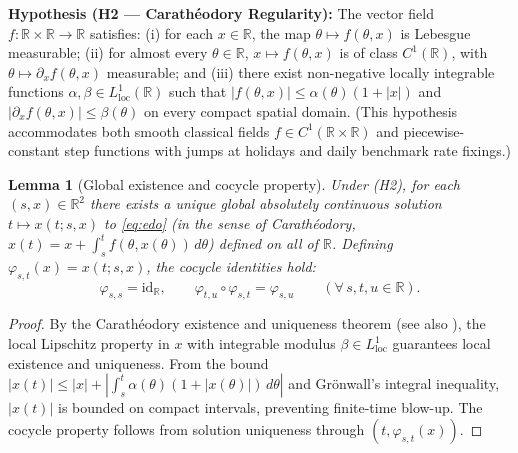 \documentclass[11pt, a4paper]{article}
\theoremstyle{definition}
\theoremstyle{plain}
\newtheorem{lema}[definicao]{Lemma}
\theoremstyle{remark}
\begin{document}
\noindent\textbf{Hypothesis (H2 — Carathéodory Regularity):} The vector field $f : \mathbb{R} \times \mathbb{R} \to \mathbb{R}$ satisfies: (i) for each $x \in \mathbb{R}$, the map $\theta \mapsto f(\theta, x)$ is Lebesgue measurable; (ii) for almost every $\theta \in \mathbb{R}$, $x \mapsto f(\theta, x)$ is of class $C^1(\mathbb{R})$, with $\theta \mapsto \partial_x f(\theta, x)$ measurable; and (iii) there exist non-negative locally integrable functions $\alpha, \beta \in L^1_{\text{loc}}(\mathbb{R})$ such that $|f(\theta, x)| \le \alpha(\theta)(1 + |x|)$ and $|\partial_x f(\theta, x)| \le \beta(\theta)$ on every compact spatial domain. (This hypothesis accommodates both smooth classical fields $f \in C^1(\mathbb{R} \times \mathbb{R})$ and piecewise-constant step functions with jumps at holidays and daily benchmark rate fixings.)

\begin{lema}[Global existence and cocycle property]\label{lem:3.1}
Under (H2), for each $(s, x) \in \mathbb{R}^2$ there exists a unique global absolutely continuous solution $t \mapsto x(t; s, x)$ to \eqref{eq:edo} (in the sense of Carathéodory, $x(t) = x + \int_s^t f(\theta, x(\theta))\,d\theta$) defined on all of $\mathbb{R}$. Defining $\varphi_{s,t}(x) = x(t; s, x)$, the cocycle identities hold:
\[
\varphi_{s,s} = \mathrm{id}_{\mathbb{R}}, \qquad \varphi_{t,u} \circ \varphi_{s,t} = \varphi_{s,u} \qquad (\forall\, s, t, u \in \mathbb{R}).
\]
\end{lema}
\begin{proof}
By the Carathéodory existence and uniqueness theorem \cite[Chap.~2]{CoddingtonLevinson1955} (see also \cite{Hartman2002, HirschSmaleDevaney2013, Sotomayor1979}), the local Lipschitz property in $x$ with integrable modulus $\beta \in L^1_{\text{loc}}$ guarantees local existence and uniqueness. From the bound $|x(t)| \le |x| + \left|\int_s^t \alpha(\theta)(1 + |x(\theta)|)\,d\theta\right|$ and Grönwall's integral inequality, $|x(t)|$ is bounded on compact intervals, preventing finite-time blow-up. The cocycle property follows from solution uniqueness through $(t, \varphi_{s,t}(x))$.
\end{proof}
\end{document}
